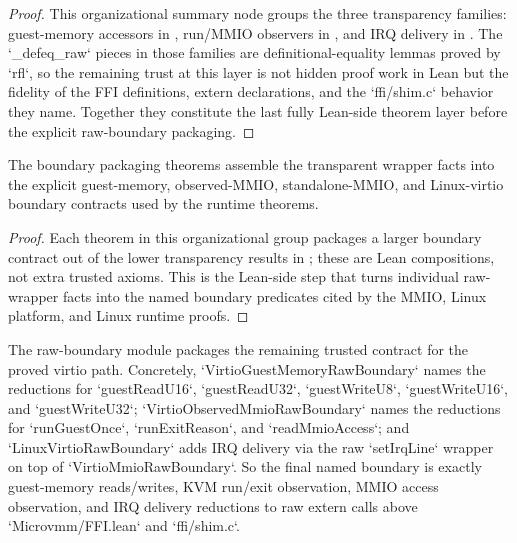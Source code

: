 \begin{proof}
\leanok
{}
This organizational summary node groups the three transparency families: guest-memory accessors in , run/MMIO observers in , and IRQ delivery in .
The `_defeq_raw` pieces in those families are definitional-equality lemmas proved by `rfl`, so the remaining trust at this layer is not hidden proof work in Lean but the fidelity of the FFI definitions, extern declarations, and the `ffi/shim.c` behavior they name.
Together they constitute the last fully Lean-side theorem layer before the explicit raw-boundary packaging.
\end{proof}

\begin{theorem}
\label{thm:raw-boundary-packages}
\leanok
The boundary packaging theorems assemble the transparent wrapper facts into the explicit guest-memory, observed-MMIO, standalone-MMIO, and Linux-virtio boundary contracts used by the runtime theorems.
\end{theorem}

\begin{proof}
\leanok
{}
Each theorem in this organizational group packages a larger boundary contract out of the lower transparency results in ; these are Lean compositions, not extra trusted axioms.
This is the Lean-side step that turns individual raw-wrapper facts into the named boundary predicates cited by the MMIO, Linux platform, and Linux runtime proofs.
\end{proof}

\begin{theorem}
\label{thm:kvm-boundary}
\leanok
The raw-boundary module packages the remaining trusted contract for the proved virtio path. Concretely, `VirtioGuestMemoryRawBoundary` names the reductions for `guestReadU16`, `guestReadU32`, `guestWriteU8`, `guestWriteU16`, and `guestWriteU32`; `VirtioObservedMmioRawBoundary` names the reductions for `runGuestOnce`, `runExitReason`, and `readMmioAccess`; and `LinuxVirtioRawBoundary` adds IRQ delivery via the raw `setIrqLine` wrapper on top of `VirtioMmioRawBoundary`. So the final named boundary is exactly guest-memory reads/writes, KVM run/exit observation, MMIO access observation, and IRQ delivery reductions to raw extern calls above `Microvmm/FFI.lean` and `ffi/shim.c`.
\end{theorem}

